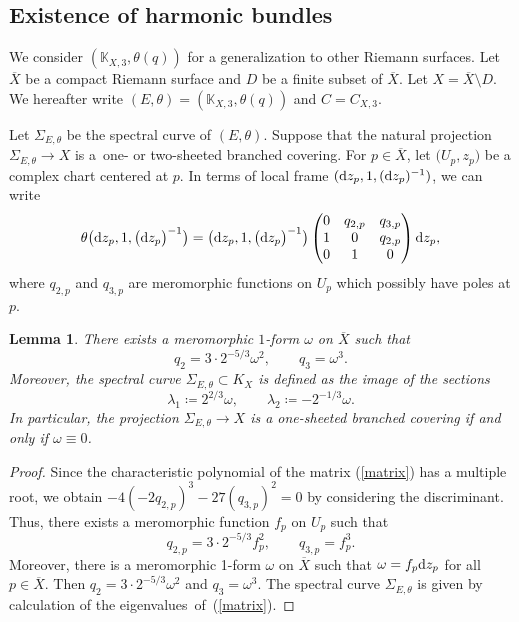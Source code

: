 \documentclass[pdftex]{sigma}
\numberwithin{equation}{section}
\newtheorem{Lemma}[Theorem]{Lemma}
\begin{document}
\subsection{Existence of harmonic bundles}\label{subsection_existence}
We consider $(\mathbb{K}_{X,3},\theta(q))$ for a generalization to other Riemann surfaces.
Let $\overline{X}$ be a compact Riemann surface and $D$ be a finite subset of $\overline{X}$. Let $X=\overline{X}\setminus D$.
We hereafter write ${(E,\theta) = (\mathbb{K}_{X,3},\theta(q))}$ and $C=C_{X,3}$.

Let $\Sigma_{E,\theta}$ be the spectral curve of $(E,\theta)$. Suppose that the natural projection $\Sigma_{E,\theta}\to X$ is a~one- or two-sheeted branched covering.
For $p\in\overline{X}$, let $\bigl(U_p,z_p\bigr)$ be a complex chart centered at $p$. In terms of local frame $({\rm d}z_p,1,({\rm d}z_p)^{-1})$, we can write
\begin{equation}\label{matrix}
 \theta \bigl({\rm d}z_p,1,\bigl({\rm d}z_p\bigr)^{-1}\bigr) = \bigl({\rm d}z_p,1,\bigl({\rm d}z_p\bigr)^{-1}\bigr) \begin{pmatrix}
 0 & q_{2,p} & q_{3,p}\\
 1 & 0 & q_{2,p} \\
 0 & 1 & 0
 \end{pmatrix} {\rm d}z_p,
\end{equation}
where $q_{2,p}$ and $q_{3,p}$ are meromorphic functions on $U_p$ which possibly have poles at $p$.
\begin{Lemma}\label{meromorphic_form}
 There exists a meromorphic $1$-form $\omega$ on $\overline{X}$ such that
 \begin{equation*}%
 q_2=3\cdot 2^{-5/3}\omega^2,\qquad q_3=\omega^3.
 \end{equation*}
 Moreover, the spectral curve $\Sigma_{E,\theta}\subset K_X$ is defined as the image of the sections
 \begin{equation*}%
 \lambda_1\coloneqq2^{2/3}\omega,\qquad\lambda_2\coloneqq -2^{-1/3}\omega.
 \end{equation*}
 In particular, the projection $\Sigma_{E,\theta}\to X$ is a one-sheeted branched covering if and only if $\omega\equiv 0$.
\end{Lemma}
\begin{proof}
 Since the characteristic polynomial of the matrix (\ref{matrix}) has a multiple root, we obtain $-4(-2q_{2,p})^3-27(q_{3,p})^2=0$ by considering the discriminant. Thus, there exists a meromorphic function $f_p$ on $U_p$ such that
 \begin{equation*}
 q_{2,p}=3\cdot 2^{-5/3}f_p^2,\qquad q_{3,p}=f_p^3.
 \end{equation*}
 Moreover, there is a meromorphic 1-form $\omega$ on $\overline{X}$ such that $\omega=f_p {\rm d}z_p$ for all $p\in \overline{X}$. Then ${q_2=3\cdot 2^{-5/3}\omega^2}$ and $q_3=\omega^3$. The spectral curve $\Sigma_{E,\theta}$ is given by calculation of the eigenvalues~of~(\ref{matrix}).
\end{proof}
\end{document}
